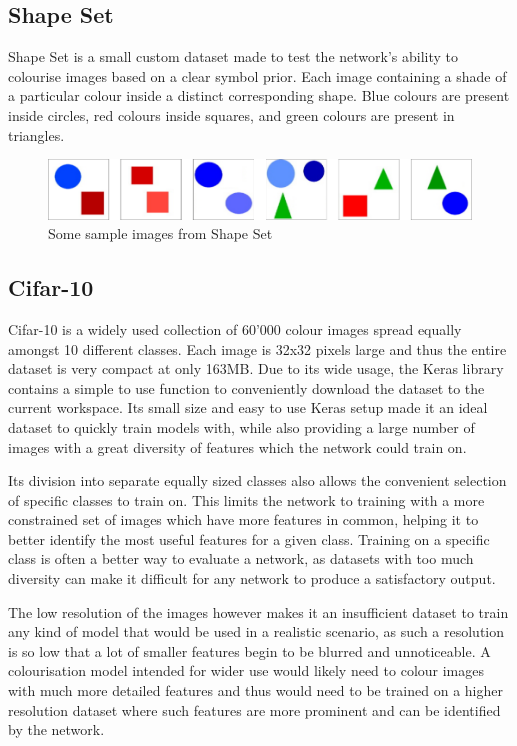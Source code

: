 \documentclass{l4proj}
\begin{document}
\subsection{Shape Set}
Shape Set is a small custom dataset made to test the network's ability to colourise images based on a clear symbol prior. Each image containing a shade of a particular colour inside a distinct corresponding shape. Blue colours are present inside circles, red colours inside squares, and green colours are present in triangles.
\begin{figure}[h]
    \centering
    \includegraphics[width=1.0\linewidth]{images/ShapeSet.png}    

    \caption{Some sample images from Shape Set}

    \label{fig:shapeset} 
\end{figure}

\subsection{Cifar-10}
Cifar-10 is a widely used collection of 60'000 colour images spread equally amongst 10 different classes. Each image is 32x32 pixels large and thus the entire dataset is very compact at only 163MB. Due to its wide usage, the Keras library contains a simple to use function to conveniently download the dataset to the current workspace. Its small size and easy to use Keras setup made it an ideal dataset to quickly train models with, while also providing a large number of images with a great diversity of features which the network could train on. 

Its division into separate equally sized classes also allows the convenient selection of specific classes to train on. This limits the network to training with a more constrained set of images which have more features in common, helping it to better identify the most useful features for a given class. Training on a specific class is often a better way to evaluate a network, as datasets with too much diversity can make it difficult for any network to produce a satisfactory output. 

The low resolution of the images however makes it an insufficient dataset to train any kind of model that would be used in a realistic scenario, as such a resolution is so low that a lot of smaller features begin to be blurred and unnoticeable. A colourisation model intended for wider use would likely need to colour images with much more detailed features and thus would need to be trained on a higher resolution dataset where such features are more prominent and can be identified by the network.
\end{document}
